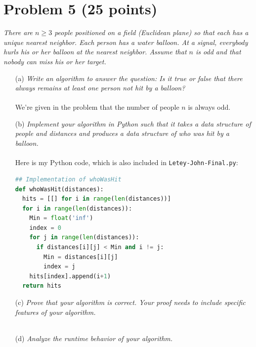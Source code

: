 \documentclass[12pt]{article}
\begin{document}
{\section*{{\selectfont Problem 5 (25 points)}}\vspace{-10mm}
\textsl{There are $n \geq 3$ people positioned on a field (Euclidean plane) so that each has a unique nearest neighbor. Each person has a water balloon. At a signal, everybody hurls his or her balloon at the nearest neighbor. Assume that $n$ is odd and that nobody can miss his or her target.}
\begin{enumerate}
\item[(a)]\textsl{Write an algorithm to answer the question: Is it true or false that there always remains at least one person not hit by a balloon?}\\ \\
We're given in the problem that the number of people $n$ is always odd. 
\item[(b)]\textsl{Implement your algorithm in Python such that it takes a data structure of people and distances and produces a data structure of who was hit by a balloon.}\\ \\
Here is my Python code, which is also included in \texttt{Letey-John-Final.py}:
\begin{lstlisting}[language=Python]
## Implementation of whoWasHit
def whoWasHit(distances):
  hits = [[] for i in range(len(distances))]
  for i in range(len(distances)):
    Min = float('inf')
    index = 0
    for j in range(len(distances)):
      if distances[i][j] < Min and i != j:
        Min = distances[i][j]
        index = j
    hits[index].append(i+1)
  return hits
\end{lstlisting}
\item[(c)]\textsl{Prove that your algorithm is correct. Your proof needs to include specific features of your algorithm.}\\ \\
\item[(d)]\textsl{Analyze the runtime behavior of your algorithm.}\\ \\
\end{enumerate}
}
\end{document}
